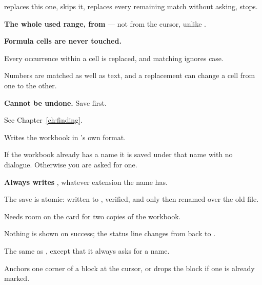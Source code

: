 \begin{ccsteps}
\item {} replaces this one,  skips it,  replaces every
remaining match without asking,  stops.
\item \textbf{The whole used range, from } --- not from the cursor,
unlike .
\item \textbf{Formula cells are never touched.}
\item Every occurrence within a cell is replaced, and matching ignores case.
\item Numbers are matched as well as text, and a replacement can change a cell
from one to the other.
\item \textbf{Cannot be undone.} Save first.
\item See Chapter~\ref{ch:finding}.
\end{ccsteps}


Writes the workbook in \ccprod's own  format.

\begin{ccsteps}
\item If the workbook already has a name it is saved under that name with no
dialogue. Otherwise you are asked for one.
\item \textbf{Always writes }, whatever extension the name has.
\item The save is atomic: written to , verified, and only
then renamed over the old file.
\item Needs room on the card for two copies of the workbook.
\item Nothing is shown on success; the status line changes from 
back to .
\end{ccsteps}


The same as , except that it always asks for a name.


Anchors one corner of a block at the cursor, or drops the block if one is
already marked.

